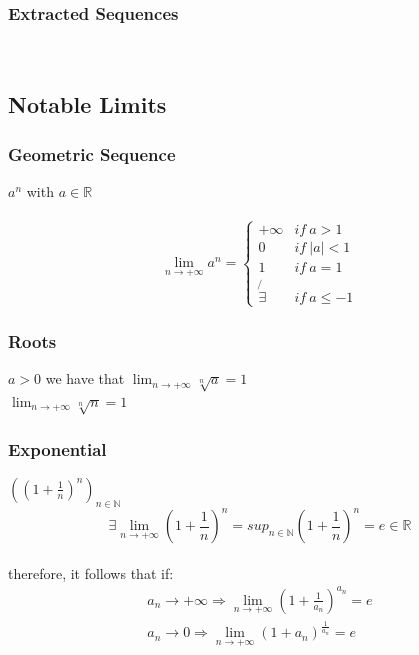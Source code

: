 \documentclass[a4paper]{report}
\begin{document}
\subsubsection{\textbf{Extracted Sequences}}
\\ 
\subsection{\textbf{Notable Limits}}
\subsubsection{\textbf{Geometric Sequence}}
 $a^{n}$ with $a\in\mathbb{R}$ \\ \\
\begin{equation}
    \lim_{n \to +\infty } a^{n} = \left\{\begin{matrix}
+\infty & if\ a > 1\\ 
0 & if\ \left | a \right | < 1\\ 
1 & if\ a = 1 \\ 
\not{\exists}  & if\ a \leq -1 
\end{matrix}\right.
\end{equation}
\subsubsection{\textbf{Roots}}
 $ a > 0 $ we have that $\lim_{n \to +\infty} \sqrt[n]{a} = 1$\\
 $ \lim_{n \to +\infty} \sqrt[n]{n} = 1 $
\subsubsection{\textbf{Exponential}}
 $ \left ( \left ( 1 + \frac{1}{n} \right )^{n} \right )_{n\in\mathbb{N}} $ \\
\begin{equation}
    \exists \lim_{n \to +\infty}\left ( 1 + \frac{1}{n} \right )^{n} = sup_{n\in\mathbb{N}} \left ( 1 + \frac{1}{n} \right )^{n} = e \in \mathbb{R}
\end{equation}
\\therefore, it follows that if:\\
\begin{align}
a_{n}\rightarrow +\infty \Rightarrow \lim_{n \to +\infty}\left ( 1 + \frac{1}{a_{n}} \right )^{a_{n}} = e\\
a_{n}\rightarrow 0 \Rightarrow \lim_{n \to +\infty}\left ( 1 + a_{n} \right )^{\frac{1}{a_{n}}} = e
\end{align}
\end{document}
